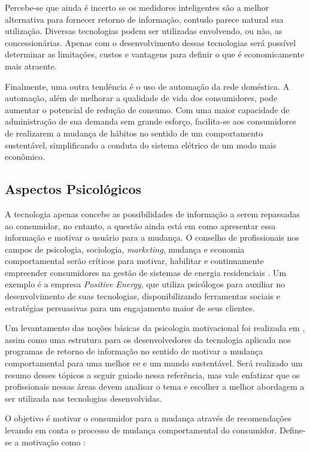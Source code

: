 Percebe-se que ainda é incerto se os medidores inteligentes são a melhor
alternativa para fornecer retorno de informação, contudo parece natural sua
utilização. Diversas tecnologias podem ser utilizadas envolvendo, ou não, as
concessionárias. Apenas com o desenvolvimento dessas tecnologias será
possível determinar as limitações, custos e vantagens para definir o que é
economicamente mais atraente.

Finalmente, uma outra tendência é o uso de automação da rede doméstica. A
automação, além de melhorar a qualidade de vida dos consumidores, pode aumentar
o potencial de redução de consumo. Com uma maior capacidade de administração de
sua demanda sem grande esforço, facilita-se aos consumidores de realizarem a
mudança de hábitos no sentido de um comportamento sustentável, simplificando
a conduta do sistema elétrico de um modo mais econômico.

\subsection{Aspectos Psicológicos}
\label{ssec:asp_psic}

A tecnologia apenas concebe as possibilidades de informação a
serem repassadas ao consumidor, no entanto, a questão ainda está em como
apresentar essa informação e motivar o usuário para a mudança.
O conselho de profissionais nos campos de psicologia, sociologia,
\emph{marketing}, mudança e economia comportamental serão críticos para
motivar, habilitar e continuamente empreender consumidores na gestão de sistemas
de energia residenciais \cite{aceee_2010_estudos_feedback}.
Um exemplo é a empresa \emph{Positive Energy}, que utiliza psicólogos para
auxiliar no desenvolvimento de suas tecnologias, disponibilizando ferramentas
sociais e estratégias persuasivas para um engajamento maior de seus clientes.

Um levantamento das noções básicas da psicologia motivacional foi realizada em
\cite{2010_aspectos_psicologicos_usa}, assim como uma estrutura para os desenvolvedores
da tecnologia aplicada nos programas de retorno de informação no sentido de motivar a
mudança comportamental para uma melhor \gls{ee} e um mundo sustentável.
Será realizado um resumo desses tópicos a seguir guiado nessa referência, mas
vale enfatizar que os profissionais nessas áreas devem analisar o tema e
escolher a melhor abordagem a ser utilizada nas tecnologias desenvolvidas.

O objetivo é motivar o consumidor para a mudança através
de recomendações levando em conta o processo de mudança comportamental
do consumidor. Define-se a motivação como
\cite[pp. 927-928, tradução própria]{2010_aspectos_psicologicos_usa}:

